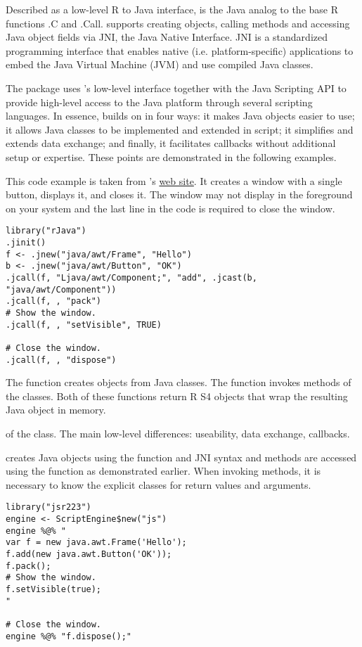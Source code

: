 Described as a low-level R to Java interface,  is the Java analog to the base R functions .C and .Call.  supports creating objects, calling methods and accessing Java object fields via JNI, the Java Native Interface. JNI is a standardized programming interface that enables native (i.e. platform-specific) applications to embed the Java Virtual Machine (JVM) and use compiled Java classes.

The  package uses 's low-level interface together with the Java Scripting API to provide high-level access to the Java platform through several scripting languages. In essence,  builds on  in four ways: it makes Java objects easier to use; it allows Java classes to be implemented and extended in script; it simplifies and extends data exchange; and finally, it facilitates callbacks without additional setup or expertise. These points are demonstrated in the following examples.

This code example is taken from 's \href{http://www.rforge.net/rJava/}{web site}. It creates a window with a single button, displays it, and closes it.  The window may not display in the foreground on your system and the last line in the code is required to close the window.

\begin{verbatim}
library("rJava")
.jinit()
f <- .jnew("java/awt/Frame", "Hello")
b <- .jnew("java/awt/Button", "OK")
.jcall(f, "Ljava/awt/Component;", "add", .jcast(b, "java/awt/Component"))
.jcall(f, , "pack")
# Show the window.
.jcall(f, , "setVisible", TRUE)

# Close the window.
.jcall(f, , "dispose")
\end{verbatim}

The  function  creates objects from Java classes. The  function invokes methods of the classes. Both of these functions return R S4 objects that wrap the resulting Java object in memory.

 of the  class. 
The main low-level differences: useability, data exchange, callbacks.


 creates Java objects using the  function and JNI syntax and methods are accessed using the  function as demonstrated earlier. When invoking methods, it is necessary to know the explicit classes for return values and arguments.

\begin{verbatim}
library("jsr223")
engine <- ScriptEngine$new("js")
engine %@% "
var f = new java.awt.Frame('Hello');
f.add(new java.awt.Button('OK'));
f.pack();
# Show the window.
f.setVisible(true);
"

# Close the window.
engine %@% "f.dispose();"
\end{verbatim}

